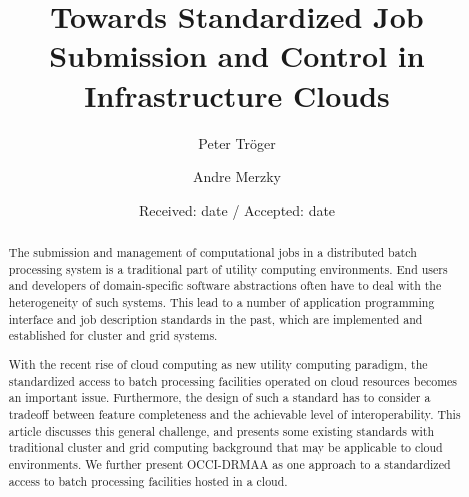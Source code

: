 \documentclass[twocolumn]{svjour3}       %
\begin{document}

\title{Towards Standardized Job Submission and Control in Infrastructure Clouds}
\author{Peter Tr\"oger \and Andre Merzky}

\date{Received: date / Accepted: date}

\maketitle

\makeglossaries


\begin{abstract}
The submission and management of computational jobs in a distributed batch processing system is a traditional part of utility computing environments. End users and developers of domain-specific software abstractions often have to deal with the heterogeneity of such systems. This lead to a number of application programming interface and job description standards in the past, which are implemented and established for cluster and grid systems.

With the recent rise of cloud computing as new utility computing paradigm, the standardized access to batch processing facilities operated on cloud resources becomes an important issue. Furthermore, the design of such a standard has to consider a tradeoff between feature completeness and the achievable level of interoperability. This article discusses this general challenge, and presents some existing standards with traditional cluster and grid computing background that may be applicable to cloud environments. We further present OCCI-DRMAA as one approach to a standardized access to batch processing facilities hosted in a cloud. 
\end{abstract}
\end{document}
